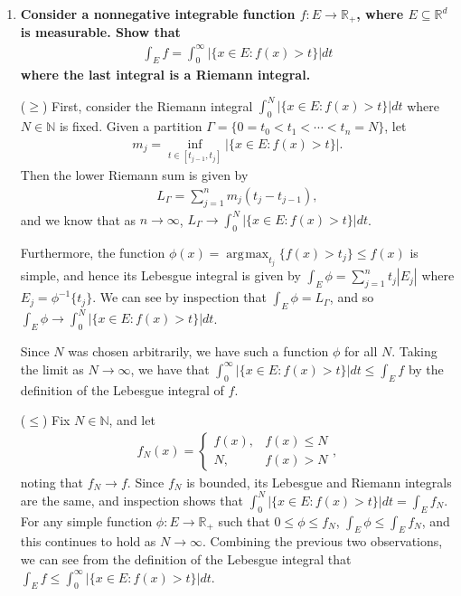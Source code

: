 \documentclass[a4paper,12pt]{article}
\DeclareMathOperator*{\argmax}{\arg\!\max}
\begin{document}
\begin{enumerate}
    \item
        \boldmath\textbf{Consider a nonnegative integrable function $f : E \to \mathbb{R}_+$, where $E \subseteq \mathbb{R}^d$ is measurable. Show that
        \begin{align*}
            \int_E f = \int_0^\infty |\{ x \in E : f(x) > t \}| dt
        \end{align*}
        where the last integral is a Riemann integral.
        }\unboldmath \par
        ($\geq$) First, consider the Riemann integral $\int_0^N |\{ x \in E : f(x) > t \}| dt$ where $N \in \mathbb{N}$ is fixed. Given a partition $\Gamma = \{ 0 = t_0 < t_1 < \cdots < t_n = N\}$, let
        \begin{align*}
            m_j = \inf_{t \in [t_{j - 1}, t_j]} |\{ x \in E : f(x) > t \}|.
        \end{align*}
        Then the lower Riemann sum is given by
        \begin{align*}
            L_\Gamma = \sum_{j = 1}^n m_j (t_j - t_{j - 1}),
        \end{align*}
        and we know that as $n \to \infty$, $L_\Gamma \to \int_0^N |\{ x \in E : f(x) > t \}| dt$. \par
        Furthermore, the function $\phi(x) = \argmax_{t_j} \{ f(x) > t_j \} \leq f(x)$ is simple, and hence its Lebesgue integral is given by $\int_E \phi = \sum_{j = 1}^n t_j |E_j|$ where $E_j = \phi^{-1}\{t_j\}$. We can see by inspection that $\int_E \phi = L_\Gamma$, and so $\int_E \phi \to \int_0^N |\{ x \in E : f(x) > t \}| dt$. \par
        Since $N$ was chosen arbitrarily, we have such a function $\phi$ for all $N$. Taking the limit as $N \to \infty$, we have that $\int_0^\infty |\{ x \in E : f(x) > t \}| dt \leq \int_E f$ by the definition of the Lebesgue integral of $f$. \par
        ($\leq$) Fix $N \in \mathbb{N}$, and let
        \begin{align*}
            f_N(x) = \begin{cases}
                f(x), &f(x) \leq N \\
                N,    &f(x) > N
            \end{cases},
        \end{align*}
        noting that $f_N \to f$. Since $f_N$ is bounded, its Lebesgue and Riemann integrals are the same, and inspection shows that $\int_0^N |\{ x \in E : f(x) > t \}| dt = \int_E f_N$. For any simple function $\phi : E \to \mathbb{R}_+$ such that $0 \leq \phi \leq f_N$, $\int_E \phi \leq \int_E f_N$, and this continues to hold as $N \to \infty$. Combining the previous two observations, we can see from the definition of the Lebesgue integral that $\int_E f \leq \int_0^\infty |\{ x \in E : f(x) > t \}| dt$.


\end{enumerate}
\end{document}
